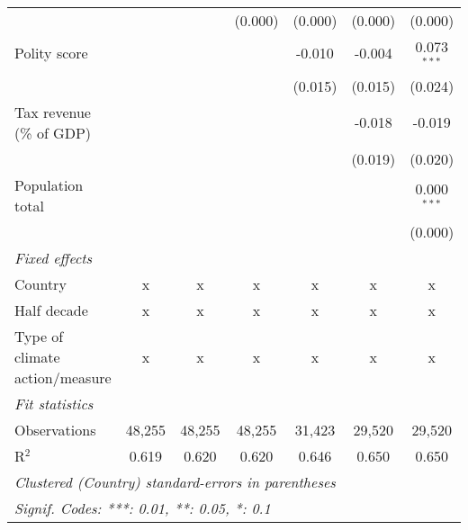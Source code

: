 \begin{tabular}{lcccccc}
                                                                               &         &                & (0.000)        & (0.000)        & (0.000)        & (0.000)\\   
   Polity score                                                                &         &                &                & -0.010         & -0.004         & 0.073$^{***}$\\   
                                                                               &         &                &                & (0.015)        & (0.015)        & (0.024)\\   
   Tax revenue (\% of GDP)                                                     &         &                &                &                & -0.018         & -0.019\\   
                                                                               &         &                &                &                & (0.019)        & (0.020)\\   
   Population total                                                            &         &                &                &                &                & 0.000$^{***}$\\   
                                                                               &         &                &                &                &                & (0.000)\\   
   \emph{Fixed effects}\\
   Country                                                                     & x       & x              & x              & x              & x              & x\\  
   Half decade                                                                 & x       & x              & x              & x              & x              & x\\  
   Type of climate action/measure                                              & x       & x              & x              & x              & x              & x\\  
   \midrule \emph{Fit statistics}\\
   Observations                                                                & 48,255  & 48,255         & 48,255         & 31,423         & 29,520         & 29,520\\  
   R$^2$                                                                       & 0.619   & 0.620          & 0.620          & 0.646          & 0.650          & 0.650\\  
   \midrule
   \multicolumn{7}{l}{\emph{Clustered (Country) standard-errors in parentheses}}\\
   \multicolumn{7}{l}{\emph{Signif. Codes: ***: 0.01, **: 0.05, *: 0.1}}\\
\end{tabular}
\par\endgroup


